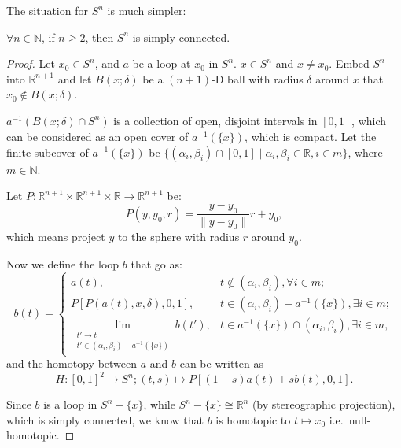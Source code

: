 \documentclass[openany, oneside, a5paper]{book}
\begin{document}
The situation for $S^n$ is much simpler:
\begin{theorem}\label{theorem: S^n for n >= 2 is simply connected}
    $\forall n \in \mathbb N$, if $n \geq 2$, then $S^n$ is simply connected.
\end{theorem}
\begin{proof}
    Let $x_0 \in S^n$, and $a$ be a loop at $x_0$ in $S^n$.
    $x \in S^n$ and $x \neq x_0$.
    Embed $S^n$ into $\mathbb R^{n+1}$ and let $B(x; \delta)$ be a $(n+1)$-D ball with radius $\delta$ around $x$ that $x_0 \notin B(x; \delta)$.

    $a^{-1}(B(x; \delta) \cap S^n)$ is a collection of open, disjoint intervals in $[0, 1]$, which can be considered as an open cover of $a^{-1}(\{x\})$, which is compact.
    Let the finite subcover of $a^{-1}(\{x\})$ be $\{(\alpha_i, \beta_i) \cap [0, 1] \mid \alpha_i, \beta_i \in \mathbb R, i \in m\}$, where $m \in \mathbb N$.

    
    Let $P \colon \mathbb R^{n+1} \times \mathbb R^{n+1} \times \mathbb R \to \mathbb R^{n+1}$ be:
    \begin{equation*}
        P(y, y_0, r) = \frac{y - y_0}{\|y - y_0\|} r + y_0,
    \end{equation*}
    which means project $y$ to the sphere with radius $r$ around $y_0$.

    Now we define the loop $b$ that go as:
    \begin{equation*}
        b(t) = \begin{cases}
            a(t),
                & t \notin (\alpha_i, \beta_i), \forall i \in m; \\
            P[P(a(t), x, \delta), 0, 1] , 
                & t \in (\alpha_i, \beta_i) - a^{-1}(\{x\}), \exists i \in m; \\
            \lim\limits_{\substack{t' \to t\\t' \in (\alpha_i, \beta_i) - a^{-1}(\{x\})}} b(t') , 
                & t \in a^{-1}(\{x\}) \cap (\alpha_i, \beta_i), \exists i \in m,
        \end{cases}
    \end{equation*}
    and the homotopy between $a$ and $b$ can be written as
    \begin{equation*}
        H \colon [0, 1]^2 \to S^n; (t, s) \mapsto P[(1 - s)a(t) + sb(t), 0, 1].
    \end{equation*}

    Since $b$ is a loop in $S^n - \{x\}$, while $S^n - \{x\} \cong \mathbb R^n$ (by stereographic projection), which is simply connected, we know that $b$ is homotopic to $t \mapsto x_0$ i.e.\ null-homotopic.
\end{proof}
\end{document}
